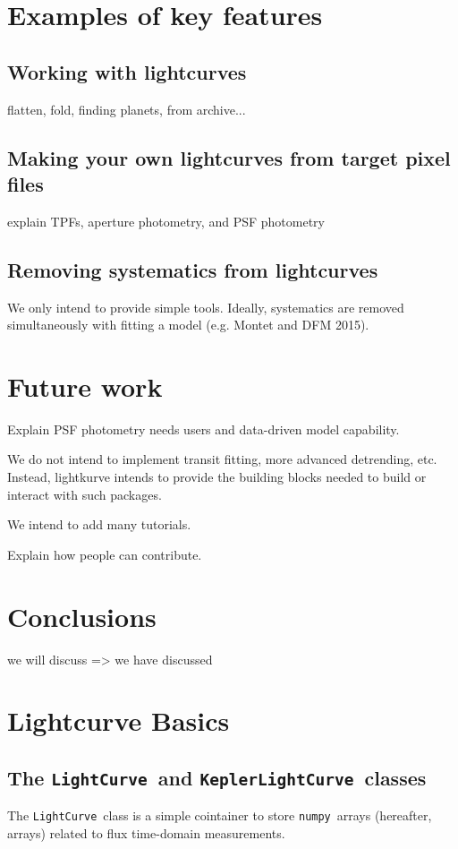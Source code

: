 \documentclass[twocolumn]{aastex62}
\newcommand{\LightCurve}{\texttt{LightCurve}} d
\newcommand{\KeplerLightCurve}{\texttt{KeplerLightCurve}}
\newcommand{\numpy}{\texttt{numpy}}
\begin{document}
\section{Examples of key features}

\subsection{Working with lightcurves}

flatten, fold, finding planets, from archive...

\subsection{Making your own lightcurves from target pixel files}

explain TPFs, aperture photometry, and PSF photometry

\subsection{Removing systematics from lightcurves}

We only intend to provide simple tools.
Ideally, systematics are removed simultaneously with fitting a model (e.g. Montet and DFM 2015).

\section{Future work}

Explain PSF photometry needs users and data-driven model capability.

We do not intend to implement transit fitting, more advanced detrending, etc.
Instead, lightkurve intends to provide the building blocks needed to build
or interact with such packages.

We intend to add many tutorials.

Explain how people can contribute.


\section{Conclusions}

we will discuss => we have discussed


\section{Lightcurve Basics}

\subsection{The \LightCurve~and \KeplerLightCurve~classes}
        The \LightCurve~class is a simple cointainer to store \numpy~arrays
        (hereafter, arrays) related to flux time-domain measurements.
\end{document}
